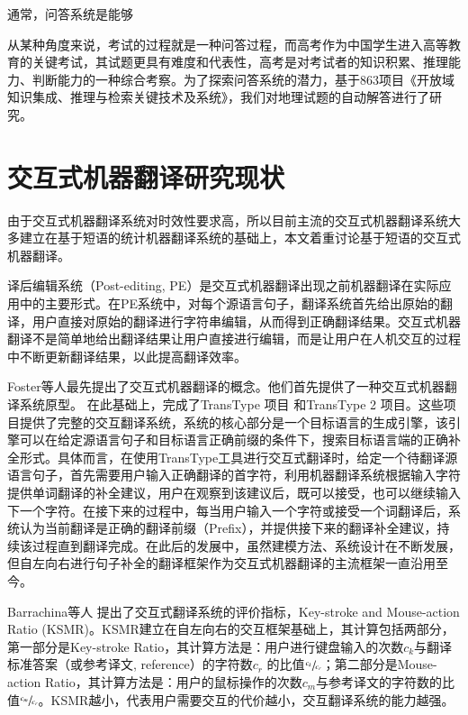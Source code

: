 \documentclass[master, winfont]{njuthesis}
\begin{document}
通常，问答系统是能够

从某种角度来说，考试的过程就是一种问答过程，而高考作为中国学生进入高等教育的关键考试，其试题更具有难度和代表性，高考是对考试者的知识积累、推理能力、判断能力的一种综合考察。为了探索问答系统的潜力，基于863项目《开放域知识集成、推理与检索关键技术及系统》，我们对地理试题的自动解答进行了研究。

\section{交互式机器翻译研究现状}
\label{section:imtnow}
由于交互式机器翻译系统对时效性要求高，所以目前主流的交互式机器翻译系统大多建立在基于短语的统计机器翻译系统的基础上，本文着重讨论基于短语的交互式机器翻译。

译后编辑系统（Post-editing, PE）\cite{allen2003post}是交互式机器翻译出现之前机器翻译在实际应用中的主要形式。在PE系统中，对每个源语言句子，翻译系统首先给出原始的翻译，用户直接对原始的翻译进行字符串编辑，从而得到正确翻译结果。交互式机器翻译不是简单地给出翻译结果让用户直接进行编辑，而是让用户在人机交互的过程中不断更新翻译结果，以此提高翻译效率。

Foster等人\cite{foster1996word}最先提出了交互式机器翻译的概念。他们首先提供了一种交互式机器翻译系统原型\cite{foster1996word,foster1997target}。 在此基础上，完成了TransType 项目\cite{langlais2000transtype} 和TransType 2 项目\cite{foster2002user}。这些项目提供了完整的交互翻译系统，系统的核心部分是一个目标语言的生成引擎，该引擎可以在给定源语言句子和目标语言正确前缀的条件下，搜索目标语言端的正确补全形式。具体而言，在使用TransType工具进行交互式翻译时，给定一个待翻译源语言句子，首先需要用户输入正确翻译的首字符，利用机器翻译系统根据输入字符提供单词翻译的补全建议，用户在观察到该建议后，既可以接受，也可以继续输入下一个字符。在接下来的过程中，每当用户输入一个字符或接受一个词翻译后，系统认为当前翻译是正确的翻译前缀（Prefix），并提供接下来的翻译补全建议，持续该过程直到翻译完成。在此后的发展中，虽然建模方法、系统设计在不断发展，但自左向右进行句子补全的翻译框架作为交互式机器翻译的主流框架一直沿用至今。

Barrachina等人\cite{barrachina2009statistical} 提出了交互式翻译系统的评价指标，Key-stroke and Mouse-action Ratio (KSMR)。KSMR建立在自左向右的交互框架基础上，其计算包括两部分，第一部分是Key-stroke Ratio，其计算方法是：用户进行键盘输入的次数$c_k$与翻译标准答案（或参考译文, reference）的字符数$c_r$ 的比值$\sfrac{c_k}{c_r}$；第二部分是Mouse-action Ratio，其计算方法是：用户的鼠标操作的次数$c_m$与参考译文的字符数的比值$\sfrac{c_m}{c_r}$。KSMR越小，代表用户需要交互的代价越小，交互翻译系统的能力越强。
\end{document}
